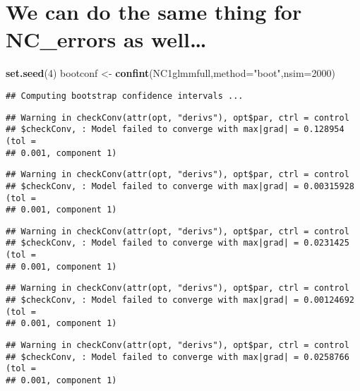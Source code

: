 \documentclass[]{article}
\newenvironment{Shaded}{\begin{snugshade}}{\end{snugshade}}
\newcommand{\KeywordTok}[1]{\textcolor[rgb]{0.13,0.29,0.53}{\textbf{#1}}}
\newcommand{\DataTypeTok}[1]{\textcolor[rgb]{0.13,0.29,0.53}{#1}}
\newcommand{\DecValTok}[1]{\textcolor[rgb]{0.00,0.00,0.81}{#1}}
\newcommand{\StringTok}[1]{\textcolor[rgb]{0.31,0.60,0.02}{#1}}
\newcommand{\NormalTok}[1]{#1}
\begin{document}
\section{We can do the same thing for NC\_errors as
well\ldots{}}\label{we-can-do-the-same-thing-for-nc_errors-as-well}

\begin{Shaded}
\begin{Highlighting}[]
\KeywordTok{set.seed}\NormalTok{(}\DecValTok{4}\NormalTok{)}
\NormalTok{bootconf <-}\StringTok{ }\KeywordTok{confint}\NormalTok{(NC1glmmfull,}\DataTypeTok{method=}\StringTok{"boot"}\NormalTok{,}\DataTypeTok{nsim=}\DecValTok{2000}\NormalTok{)}
\end{Highlighting}
\end{Shaded}

\begin{verbatim}
## Computing bootstrap confidence intervals ...
\end{verbatim}

\begin{verbatim}
## Warning in checkConv(attr(opt, "derivs"), opt$par, ctrl = control
## $checkConv, : Model failed to converge with max|grad| = 0.128954 (tol =
## 0.001, component 1)
\end{verbatim}

\begin{verbatim}
## Warning in checkConv(attr(opt, "derivs"), opt$par, ctrl = control
## $checkConv, : Model failed to converge with max|grad| = 0.00315928 (tol =
## 0.001, component 1)
\end{verbatim}

\begin{verbatim}
## Warning in checkConv(attr(opt, "derivs"), opt$par, ctrl = control
## $checkConv, : Model failed to converge with max|grad| = 0.0231425 (tol =
## 0.001, component 1)
\end{verbatim}

\begin{verbatim}
## Warning in checkConv(attr(opt, "derivs"), opt$par, ctrl = control
## $checkConv, : Model failed to converge with max|grad| = 0.00124692 (tol =
## 0.001, component 1)
\end{verbatim}

\begin{verbatim}
## Warning in checkConv(attr(opt, "derivs"), opt$par, ctrl = control
## $checkConv, : Model failed to converge with max|grad| = 0.0258766 (tol =
## 0.001, component 1)
\end{verbatim}
\end{document}
